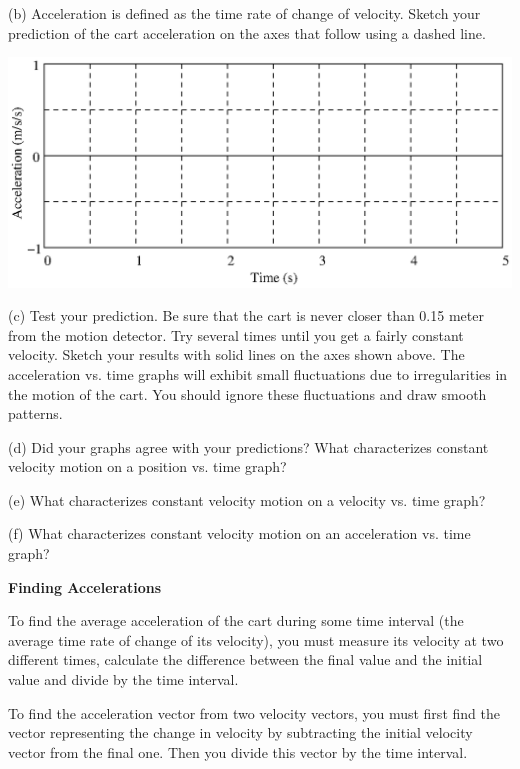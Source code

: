 (b) Acceleration is defined as the time rate of change of velocity. Sketch your
prediction of the cart acceleration on the axes that follow using a dashed line.

\vspace{0.3cm}
{\par\centering \includegraphics{changing_fig2.eps} \par}
\vspace{0.3cm}

(c) Test your prediction. Be sure that the cart is never closer than 0.15 meter
from the motion detector. Try several times until you get a fairly constant
velocity. Sketch your results with solid lines on the axes shown above. The
acceleration vs. time graphs will exhibit small fluctuations due to irregularities
in the motion of the cart. You should ignore these fluctuations and draw smooth
patterns.

(d) Did your graphs agree with your predictions? What characterizes constant
velocity motion on a position vs. time graph? 
\vspace{10mm}

(e) What characterizes constant velocity motion on a velocity vs. time graph?
\vspace{10mm}

(f) What characterizes constant velocity motion on an acceleration vs. time graph?
\vspace{10mm}

\textbf{Finding Accelerations} 

To find the average acceleration of the cart during some time interval (the
average time rate of change of its velocity), you must measure its velocity
at two different times, calculate the difference between the final value and
the initial value and divide by the time interval.

To find the acceleration vector from two velocity vectors, you must first find
the vector representing the change in velocity by subtracting the initial velocity
vector from the final one. Then you divide this vector by the time interval. 

